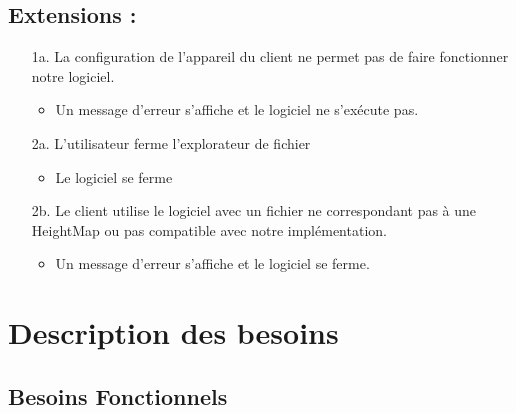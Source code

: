 \documentclass[12pt]{report}
\begin{document}
\section{Extensions :}

\begin{enumerate}

\item[\sffamily 1a.] La configuration de l'appareil du client ne permet pas de  faire fonctionner notre logiciel.
\begin{itemize}
    \item Un message d'erreur s'affiche et le logiciel ne s'exécute pas.
\end{itemize}
\item[\sffamily 2a.] L'utilisateur ferme l'explorateur de fichier
\begin{itemize}
    \item Le logiciel se ferme
\end{itemize}
\item[\sffamily 2b.] Le client utilise le logiciel avec un fichier ne correspondant pas à une HeightMap ou pas compatible avec notre implémentation.
\begin{itemize}
    \item Un message d'erreur s'affiche et le logiciel se ferme.
\end{itemize}

\end{enumerate}
\chapter{Description des besoins}

\section{Besoins Fonctionnels}
\end{document}
